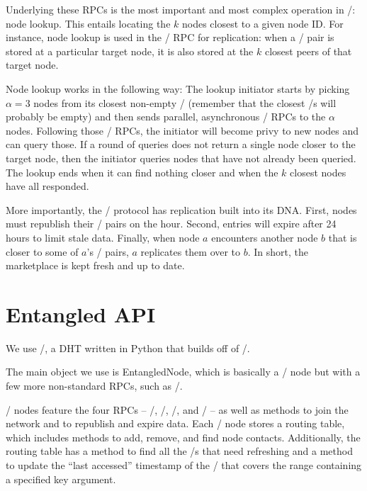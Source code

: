 \documentclass[11pt,twocolumn]{article}
\begin{document}
Underlying these RPCs is the most important and most complex operation in \Kademlia/: node lookup.
This entails locating the $k$ nodes closest to a given node ID.
For instance, node lookup is used in the \store/ RPC for replication:
when a \kv/ pair is stored at a particular target node, it is also stored at the $k$ closest peers of that target node.

Node lookup works in the following way:
The lookup initiator starts by picking $\alpha = 3$ nodes from its closest non-empty \kbucket/ (remember that the closest \kbucket/s will probably be empty) and then sends parallel, asynchronous \findNode/ RPCs to the $\alpha$ nodes.
Following those \findNode/ RPCs, the initiator will become privy to new nodes and can query those.
If a round of queries does not return a single node closer to the target node, then the initiator queries nodes that have not already been queried.
The lookup ends when it can find nothing closer and when the $k$ closest nodes have all responded.

More importantly, the \Kademlia/ protocol has replication built into its DNA.
First, nodes must republish their \kv/ pairs on the hour.
Second, entries will expire after 24 hours to limit stale data.
Finally, when node $a$ encounters another node $b$ that is closer to some of $a$'s \kv/ pairs, $a$ replicates them over to $b$.
In short, the marketplace is kept fresh and up to date.






\section{Entangled API}
We use \Entangled/, a DHT written in Python that builds off of \Kademlia/.

The main object we use is {\sc EntangledNode}, which is basically a \Kademlia/ node but with a few more non-standard RPCs, such as \delete/.

\Kademlia/ nodes feature the four RPCs -- \ping/, \store/, \findValue/, and \findNode/ -- as well as methods to join the network and to republish and expire data.
Each \Kademlia/ node stores a routing table, which includes methods to add, remove, and find node contacts. Additionally, the routing table has a method to find all the \kbucket/s that need refreshing and a method to update the ``last accessed'' timestamp of the \kbucket/ that covers the range containing a specified key argument.
\end{document}

